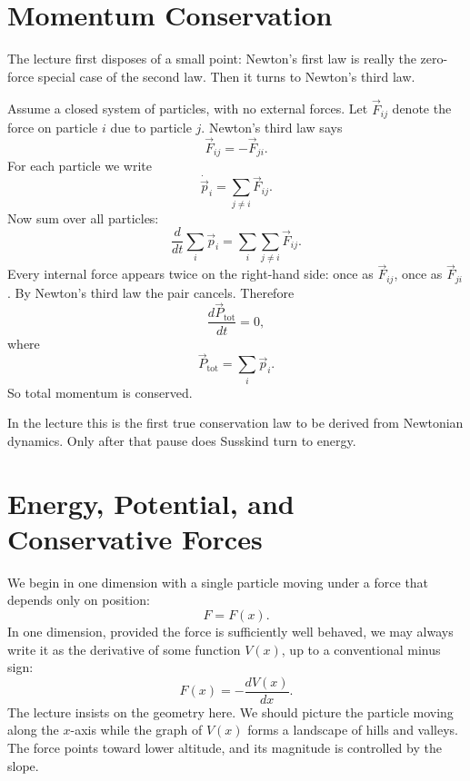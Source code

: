 \section{Momentum Conservation}

The lecture first disposes of a small point: Newton's first law is really the zero-force special case of the second law. Then it turns to Newton's third law.

Assume a closed system of particles, with no external forces. Let \(\vec F_{ij}\) denote the force on particle \(i\) due to particle \(j\). Newton's third law says
\begin{equation}
\vec F_{ij}=-\vec F_{ji}.
\end{equation}
For each particle we write
\begin{equation}
\dot{\vec p}_i=\sum_{j\ne i}\vec F_{ij}.
\end{equation}
Now sum over all particles:
\begin{equation}
\frac{d}{dt}\sum_i \vec p_i = \sum_i\sum_{j\ne i}\vec F_{ij}.
\end{equation}
Every internal force appears twice on the right-hand side: once as \(\vec F_{ij}\), once as \(\vec F_{ji}\). By Newton's third law the pair cancels. Therefore
\begin{equation}
\frac{d\vec P_{\text{tot}}}{dt}=0,
\end{equation}
where
\begin{equation}
\vec P_{\text{tot}}=\sum_i \vec p_i.
\end{equation}
So total momentum is conserved.

In the lecture this is the first true conservation law to be derived from Newtonian dynamics. Only after that pause does Susskind turn to energy.

\section{Energy, Potential, and Conservative Forces}

We begin in one dimension with a single particle moving under a force that depends only on position:
\begin{equation}
F=F(x).
\end{equation}
In one dimension, provided the force is sufficiently well behaved, we may always write it as the derivative of some function \(V(x)\), up to a conventional minus sign:
\begin{equation}
F(x)=-\frac{dV(x)}{dx}.
\end{equation}
The lecture insists on the geometry here. We should picture the particle moving along the \(x\)-axis while the graph of \(V(x)\) forms a landscape of hills and valleys. The force points toward lower altitude, and its magnitude is controlled by the slope.


